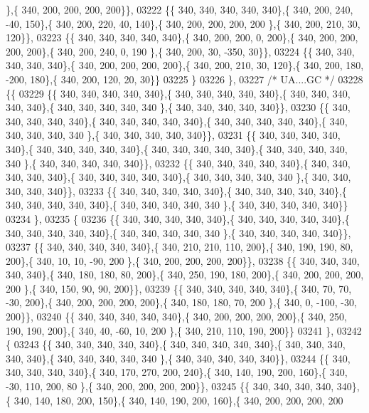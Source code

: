 \begin{DoxyCode}
      \},\{ 340, 200, 200, 200, 200\}\},
03222 \{\{ 340, 340, 340, 340, 340\},\{ 340, 200, 240, -40, 150\},\{ 340, 200, 220,  40, 140\},\{ 340, 200, 200, 200, 200
      \},\{ 340, 200, 210,  30, 120\}\},
03223 \{\{ 340, 340, 340, 340, 340\},\{ 340, 200, 200,   0, 200\},\{ 340, 200, 200, 200, 200\},\{ 340, 200, 240,   0, 190
      \},\{ 340, 200,  30, -350,  30\}\},
03224 \{\{ 340, 340, 340, 340, 340\},\{ 340, 200, 200, 200, 200\},\{ 340, 200, 210,  30, 120\},\{ 340, 200, 180, -200, 
      180\},\{ 340, 200, 120,  20,  30\}\}
03225 \}
03226 \},
03227 \textcolor{comment}{/* UA....GC */}
03228 \{\{
03229 \{\{ 340, 340, 340, 340, 340\},\{ 340, 340, 340, 340, 340\},\{ 340, 340, 340, 340, 340\},\{ 340, 340, 340, 340, 340
      \},\{ 340, 340, 340, 340, 340\}\},
03230 \{\{ 340, 340, 340, 340, 340\},\{ 340, 340, 340, 340, 340\},\{ 340, 340, 340, 340, 340\},\{ 340, 340, 340, 340, 340
      \},\{ 340, 340, 340, 340, 340\}\},
03231 \{\{ 340, 340, 340, 340, 340\},\{ 340, 340, 340, 340, 340\},\{ 340, 340, 340, 340, 340\},\{ 340, 340, 340, 340, 340
      \},\{ 340, 340, 340, 340, 340\}\},
03232 \{\{ 340, 340, 340, 340, 340\},\{ 340, 340, 340, 340, 340\},\{ 340, 340, 340, 340, 340\},\{ 340, 340, 340, 340, 340
      \},\{ 340, 340, 340, 340, 340\}\},
03233 \{\{ 340, 340, 340, 340, 340\},\{ 340, 340, 340, 340, 340\},\{ 340, 340, 340, 340, 340\},\{ 340, 340, 340, 340, 340
      \},\{ 340, 340, 340, 340, 340\}\}
03234 \},
03235 \{
03236 \{\{ 340, 340, 340, 340, 340\},\{ 340, 340, 340, 340, 340\},\{ 340, 340, 340, 340, 340\},\{ 340, 340, 340, 340, 340
      \},\{ 340, 340, 340, 340, 340\}\},
03237 \{\{ 340, 340, 340, 340, 340\},\{ 340, 210, 210, 110, 200\},\{ 340, 190, 190,  80, 200\},\{ 340,  10,  10, -90, 200
      \},\{ 340, 200, 200, 200, 200\}\},
03238 \{\{ 340, 340, 340, 340, 340\},\{ 340, 180, 180,  80, 200\},\{ 340, 250, 190, 180, 200\},\{ 340, 200, 200, 200, 200
      \},\{ 340, 150,  90,  90, 200\}\},
03239 \{\{ 340, 340, 340, 340, 340\},\{ 340,  70,  70, -30, 200\},\{ 340, 200, 200, 200, 200\},\{ 340, 180, 180,  70, 200
      \},\{ 340,   0, -100, -30, 200\}\},
03240 \{\{ 340, 340, 340, 340, 340\},\{ 340, 200, 200, 200, 200\},\{ 340, 250, 190, 190, 200\},\{ 340,  40, -60,  10, 200
      \},\{ 340, 210, 110, 190, 200\}\}
03241 \},
03242 \{
03243 \{\{ 340, 340, 340, 340, 340\},\{ 340, 340, 340, 340, 340\},\{ 340, 340, 340, 340, 340\},\{ 340, 340, 340, 340, 340
      \},\{ 340, 340, 340, 340, 340\}\},
03244 \{\{ 340, 340, 340, 340, 340\},\{ 340, 170, 270, 200, 240\},\{ 340, 140, 190, 200, 160\},\{ 340, -30, 110, 200,  80
      \},\{ 340, 200, 200, 200, 200\}\},
03245 \{\{ 340, 340, 340, 340, 340\},\{ 340, 140, 180, 200, 150\},\{ 340, 140, 190, 200, 160\},\{ 340, 200, 200, 200, 200

\end{DoxyCode}

